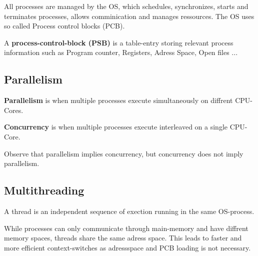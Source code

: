             All processes are managed by the OS, which schedules, synchronizes, starts and terminates processes, allows
            comminication and manages ressources. The OS uses so called Process control blocks (PCB).

            \begin{definition}

                A \textbf{process-control-block (PSB)} is a table-entry storing relevant process information such as
                Program counter, Registers, Adress Space, Open files ...
            
\end{definition}

\subsection{Parallelism}

\begin{definition}

\textbf{Parallelism } is when multiple processes execute simultaneously on diffrent CPU-Cores.
            
\end{definition}

\begin{definition}

\textbf{Concurrency } is when multiple processes execute interleaved on a single CPU-Core.
            
\end{definition}

            Observe that parallelism implies concurrency, but concurrency does not imply parallelism.

            \subsection{Multithreading}

\begin{definition}

                A thread is an independent sequence of exection running in the same OS-process.
            
\end{definition}

\begin{remark}

                While processes can only communicate through main-memory and have diffrent memory spaces, threads share
                the same adress space. This leads to faster and more efficient context-switches as adressspace and PCB
                loading is not necessary.
            
\end{remark}

